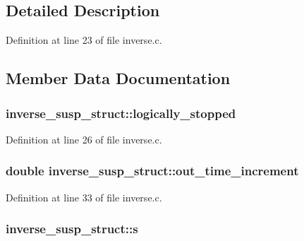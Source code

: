 \subsection{Detailed Description}


Definition at line 23 of file inverse.\+c.



\subsection{Member Data Documentation}
\subsubsection[{\texorpdfstring{logically\+\_\+stopped}{logically_stopped}}]{ inverse\+\_\+susp\+\_\+struct\+::logically\+\_\+stopped}\hypertarget{structinverse__susp__struct_a93383cac985083a74fa2bc39f6741f27}{}\label{structinverse__susp__struct_a93383cac985083a74fa2bc39f6741f27}


Definition at line 26 of file inverse.\+c.

\subsubsection[{\texorpdfstring{out\+\_\+time\+\_\+increment}{out_time_increment}}]{\setlength{\rightskip}{0pt plus 5cm}double inverse\+\_\+susp\+\_\+struct\+::out\+\_\+time\+\_\+increment}\hypertarget{structinverse__susp__struct_a9438a2fbfadc862ab87cb42bf6e203e8}{}\label{structinverse__susp__struct_a9438a2fbfadc862ab87cb42bf6e203e8}


Definition at line 33 of file inverse.\+c.

\subsubsection[{\texorpdfstring{s}{s}}]{ inverse\+\_\+susp\+\_\+struct\+::s}\hypertarget{structinverse__susp__struct_a1ba42536d4e45c1731c0a6a32dd2bdf7}{}\label{structinverse__susp__struct_a1ba42536d4e45c1731c0a6a32dd2bdf7}


